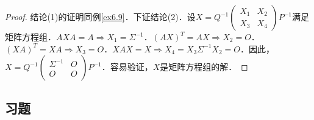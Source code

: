 \documentclass[a4paper,fontset=windows]{ctexbook}
\theoremstyle{definition}
\begin{document}
\begin{proof}
结论(1)的证明同例\ref{ex6.9}．下证结论(2)．设$X=Q^{-1}\begin{pmatrix}X_1&X_2 \\ X_3&X_4\end{pmatrix}P^{-1}$满足矩阵方程组．$AXA=A\Rightarrow X_1=\Sigma^{-1}$．$(AX)^T=AX\Rightarrow X_2=O$．$(XA)^T=XA\Rightarrow X_3=O$．$XAX=X\Rightarrow X_4=X_3\Sigma^{-1}X_2=O$．因此，$X=Q^{-1}\begin{pmatrix}\Sigma^{-1}&O \\ O&O\end{pmatrix}P^{-1}$．容易验证，$X$是矩阵方程组的解．
\end{proof}

\subsection*{习题}
\end{document}
